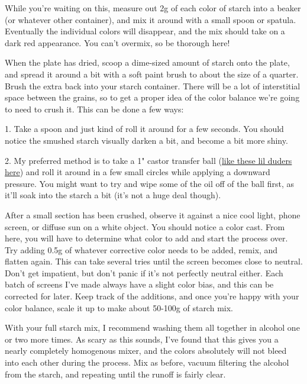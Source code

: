 \documentclass[11pt]{article}
\begin{document}
While you're waiting on this, measure out 2g of each color of starch into a beaker (or whatever other container), and mix it around with a small spoon or spatula. Eventually the individual colors will disappear, and the mix should take on a dark red appearance. You can't overmix, so be thorough here!\newline 

When the plate has dried, scoop a dime-sized amount of starch onto the plate, and spread it around a bit with a soft paint brush to about the size of a quarter. Brush the extra back into your starch container. There will be a lot of interstitial space between the grains, so to get a proper idea of the color balance we're going to need to crush it. This can be done a few ways:\newline

1. Take a spoon and just kind of roll it around for a few seconds. You should notice the smushed starch visually darken a bit, and become a bit more shiny.\newline

2. My preferred method is to take a 1" castor transfer ball (\href{https://www.amazon.com/DGQ-Transfers-Furniture-Trolley-Mounted/dp/B07HC3Z56Z/ref=sr_1_10?dchild=1&keywords=1%22+caster&qid=1587136812&sr=8-10}{like these lil duders here}) and roll it around in a few small circles while applying a downward pressure. You might want to try and wipe some of the oil off of the ball first, as it'll soak into the starch a bit (it's not a huge deal though).\newline

After a small section has been crushed, observe it against a nice cool light, phone screen, or diffuse sun on a white object. You should notice a color cast. From here, you will have to determine what color to add and start the process over. Try adding 0.5g of whatever corrective color needs to be added, remix, and flatten again. This can take several tries until the screen becomes close to neutral. Don't get impatient, but don't panic if it's not perfectly neutral either. Each batch of screens I've made always have a slight color bias, and this can be corrected for later. Keep track of the additions, and once you're happy with your color balance, scale it up to make about 50-100g of starch mix.\newline

With your full starch mix, I recommend washing them all together in alcohol one or two more times. As scary as this sounds, I've found that this gives you a nearly completely homogenous mixer, and the colors absolutely will not bleed into each other during the process. Mix as before, vacuum filtering the alcohol from the starch, and repeating until the runoff is fairly clear.\newline
\end{document}
